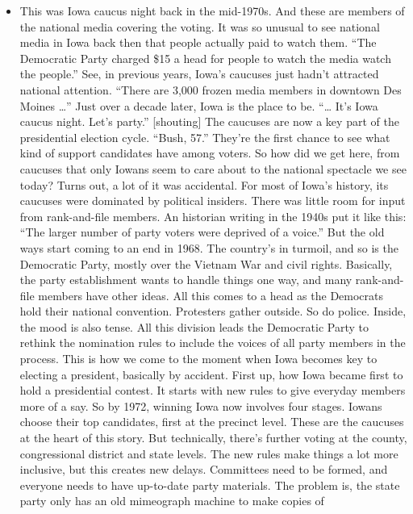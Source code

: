 \begin{itemize}
\tightlist
\item
  This was Iowa caucus night back in the mid-1970s. And these are
  members of the national media covering the voting. It was so unusual
  to see national media in Iowa back then that people actually paid to
  watch them. ``The Democratic Party charged \$15 a head for people to
  watch the media watch the people.'' See, in previous years, Iowa's
  caucuses just hadn't attracted national attention. ``There are 3,000
  frozen media members in downtown Des Moines \ldots{}'' Just over a
  decade later, Iowa is the place to be. ``\ldots{} It's Iowa caucus
  night. Let's party.'' {[}shouting{]} The caucuses are now a key part
  of the presidential election cycle. ``Bush, 57.'' They're the first
  chance to see what kind of support candidates have among voters. So
  how did we get here, from caucuses that only Iowans seem to care about
  to the national spectacle we see today? Turns out, a lot of it was
  accidental. For most of Iowa's history, its caucuses were dominated by
  political insiders. There was little room for input from rank-and-file
  members. An historian writing in the 1940s put it like this: ``The
  larger number of party voters were deprived of a voice.'' But the old
  ways start coming to an end in 1968. The country's in turmoil, and so
  is the Democratic Party, mostly over the Vietnam War and civil rights.
  Basically, the party establishment wants to handle things one way, and
  many rank-and-file members have other ideas. All this comes to a head
  as the Democrats hold their national convention. Protesters gather
  outside. So do police. Inside, the mood is also tense. All this
  division leads the Democratic Party to rethink the nomination rules to
  include the voices of all party members in the process. This is how we
  come to the moment when Iowa becomes key to electing a president,
  basically by accident. First up, how Iowa became first to hold a
  presidential contest. It starts with new rules to give everyday
  members more of a say. So by 1972, winning Iowa now involves four
  stages. Iowans choose their top candidates, first at the precinct
  level. These are the caucuses at the heart of this story. But
  technically, there's further voting at the county, congressional
  district and state levels. The new rules make things a lot more
  inclusive, but this creates new delays. Committees need to be formed,
  and everyone needs to have up-to-date party materials. The problem is,
  the state party only has an old mimeograph machine to make copies of

\end{itemize}
